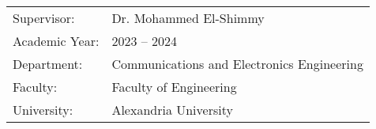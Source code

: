 \begin{titlepage}
\begin{center}
\vfill

\begin{tabular}{ll}
    {Supervisor:} & {Dr. Mohammed El-Shimmy} \\
    {Academic Year}: & {2023 -- 2024} \\
    {Department:} & {Communications and Electronics Engineering} \\
    {Faculty:} & {Faculty of Engineering} \\
    {University:} & {Alexandria University}
\end{tabular}


\end{center}








\end{titlepage}

